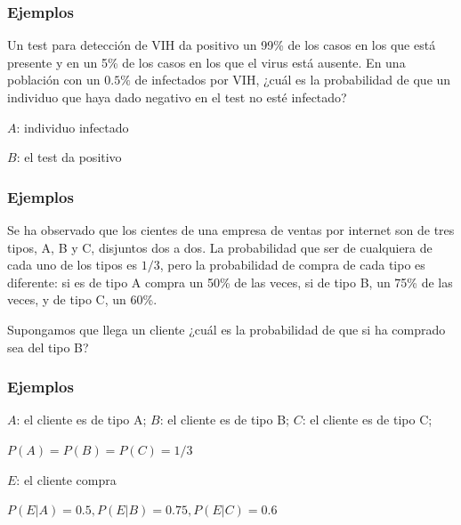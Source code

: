 \documentclass[handout]{beamer}\usepackage[]{graphicx}\usepackage[]{color}
\renewcommand{\emph}[1]{{\color{red}#1}}
\theoremstyle{plain}
\theoremstyle{definition}
\begin{document}
\begin{frame}

\frametitle{Ejemplos}  

Un test para detección de VIH da positivo un 99\% de los casos en los que  está presente y en un 5\% de los casos  en los que el virus está ausente. En una población con un  $0.5\%$ de infectados por VIH, ¿cuál es la probabilidad de que un individuo que haya dado  \emph{negativo} en el test \emph{no} esté infectado?

\medskip

$A$: individuo infectado
\medskip

$B$: el test da positivo
\medskip

\end{frame}

\begin{frame}
\frametitle{Ejemplos}  

Se ha observado que  los cientes de una empresa de ventas por internet son de tres tipos, 
A, B y C, disjuntos dos a dos. La probabilidad que  ser de cualquiera de cada uno de los tipos es $1/3$, pero la probabilidad de compra de cada tipo es diferente:  si es de tipo A  compra un 50\% de las veces,  si de tipo B, un 75\% de las veces, y de tipo C, un 60\%.\medskip

Supongamos que llega un cliente ¿cuál es la  probabilidad de  que si ha comprado sea del tipo B?



\end{frame}

\begin{frame}

\frametitle{Ejemplos}  

$A$: el cliente es de tipo  A; $B$:  el cliente es de tipo B; $C$:  el cliente es de tipo C;\medskip

 $P(A)=P(B)=P(C)=1/3$
\medskip

$E$: el cliente compra\medskip

$P(E|A)=0.5, P(E|B)=0.75, P(E|C)=0.6$
\bigskip


\end{frame}
\end{document}
